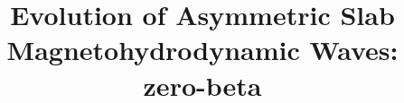 \documentclass{aastex61}
\begin{document}
\title{Evolution of Asymmetric Slab Magnetohydrodynamic Waves: zero-beta}


\end{document}
